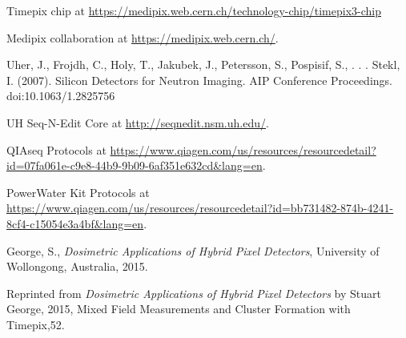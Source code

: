 \begin{thebibliography}{9}
  Timepix chip at \url{https://medipix.web.cern.ch/technology-chip/timepix3-chip}

  Medipix collaboration at \url{https://medipix.web.cern.ch/}.

  Uher, J., Frojdh, C., Holy, T., Jakubek, J., Petersson, S., Pospisif, S., . . . Stekl, I. (2007). Silicon Detectors for Neutron Imaging. AIP Conference Proceedings. doi:10.1063/1.2825756
  
  UH Seq-N-Edit Core at \url{http://seqnedit.nsm.uh.edu/}.
  
  QIAseq Protocols at \url{https://www.qiagen.com/us/resources/resourcedetail?id=07fa061e-c9e8-44b9-9b09-6af351e632cd&lang=en}.  

  PowerWater Kit Protocols at \url{https://www.qiagen.com/us/resources/resourcedetail?id=bb731482-874b-4241-8cf4-c15054e3a4bf&lang=en}.  
  
  George, S., \textit{Dosimetric Applications of Hybrid Pixel Detectors}, University of Wollongong, Australia, 2015.

  Reprinted from \textit{Dosimetric Applications of Hybrid Pixel Detectors} by Stuart George, 2015, Mixed Field Measurements and Cluster Formation with Timepix,52.


  


	



\end{thebibliography}
